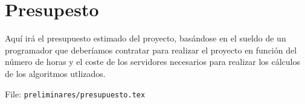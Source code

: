 %

\chapter{Presupesto}

Aquí irá el presupuesto estimado del proyecto, basándose en el sueldo de un programador que deberíamos contratar para realizar el proyecto en función del número de horas y el coste de los servidores necesarios para realizar los cálculos de los algoritmos utlizados.

File: \texttt{preliminares/presupuesto.tex}

\endinput